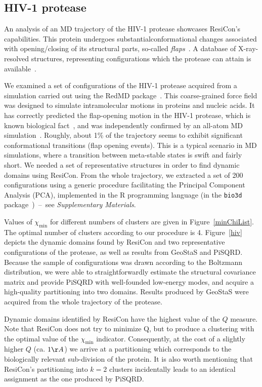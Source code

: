 \documentclass[a4paper,11pt,twoside]{book}%
\begin{document}
\subsection*{HIV-1 protease}
An analysis of an MD trajectory of the HIV-1 protease showcases ResiCon's capabilities.
This protein undergoes substantial\break conformational changes associated with opening/closing of its structural parts, so-called \emph{flaps}~\cite{hamelberg2005fast}.
A database of X-ray-resolved structures, representing configurations which the protease can attain is available~\cite{vondrasek2002hivdb}.

We examined a set of configurations of the HIV-1 protease acquired from a simulation carried out using the RedMD package~\cite{gorecki2009redmd}.
This coarse-grained force field was designed to simulate intramolecular motions in proteins and nucleic acids.
It has correctly predicted the flap-opening motion in the HIV-1 protease, which is known biological fact~\cite{hamelberg2005fast}, and was independently confirmed by an all-atom MD simulation~\cite{sadiq2010explicit}.
Roughly, about 1\% of the trajectory seems to exhibit significant conformational transitions (flap opening events).
This is a typical scenario in MD simulations, where a transition between meta-stable states is swift and fairly short.
We needed a set of representative structures in order to find dynamic domains using ResiCon.
From the whole trajectory, we extracted a set of 200 configurations using a generic procedure facilitating the Principal Component Analysis (PCA), implemented in the R programming language (in the \texttt{bio3d} package~\cite{grant2006bio3d})~--~see \emph{Supplementary Materials}.

Values of $\chi_\text{min}$ for different numbers of clusters are given in Figure~\ref{minChiList}.
The optimal number of clusters according to our procedure is 4.
Figure~\ref{hiv} depicts the dynamic domains found by ResiCon and two representative configurations of the protease, as well as results from GeoStaS and PiSQRD.
Because the sample of configurations was drawn according to the Boltzmann distribution, we were able to straightforwardly estimate the structural covariance matrix and provide PiSQRD with well-founded low-energy modes, and acquire a high-quality partitioning into two domains.
Results produced by GeoStaS were acquired from the whole trajectory of the protease.

Dynamic domains identified by ResiCon have the highest value of the $Q$ measure.
Note that ResiCon does not try to minimize Q, but to produce a clustering with the optimal value of the $\chi_\text{min}$ indicator.
Consequently, at the cost of a slightly higher $Q$ (ca. $1\AA$) we arrive at a partitioning which corresponds to the biologically relevant sub-division of the protein.
It is also worth mentioning that ResiCon's partitioning into $k=2$ clusters incidentally leads to an identical assignment as the one produced by PiSQRD.
\end{document}
